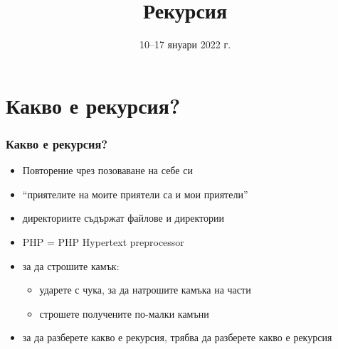 \documentclass[alsotrans]{beamerswitch}
\title{Рекурсия}
\date{10--17 януари 2022 г.}
\begin{document}
\begin{frame}
  \titlepage
\end{frame}

\section{Какво е рекурсия?}

\begin{frame}
  \frametitle{Какво е рекурсия?}

  \begin{center}
  \end{center}
  \begin{itemize}[<+(2)->]
  \item Повторение чрез позоваване на себе си
  \item ``приятелите на моите приятели са и мои приятели''
  \item директориите съдържат файлове и директории
  \item PHP = PHP Hypertext preprocessor
  \item за да строшите камък:
    \begin{itemize}
    \item ударете с чука, за да натрошите камъка на части
    \item строшете получените по-малки камъни
    \end{itemize}
  \item за да разберете какво е рекурсия, трябва да разберете какво е рекурсия
  \end{itemize}
\end{frame}
\end{document}
